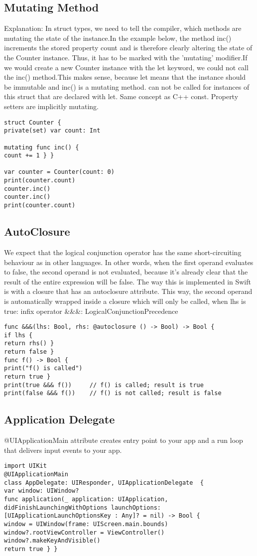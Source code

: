 \subsection{Mutating Method}
Explanation: In struct types, we need to tell the compiler, which methods are mutating the state of the instance.In the example below, the method inc() increments the stored property count and is therefore clearly altering the state of the Counter instance. Thus, it has to be marked with the 'mutating' modifier.If we would create a new Counter instance with the let keyword, we could not call the inc() method.This makes sense, because let means that the instance should be immutable and inc() is a mutating method.
can not be called for instances of this struct that are declared with let. Same concept as C++ const. Property setters are implicitly mutating.
\begin{lstlisting}
struct Counter {
private(set) var count: Int

mutating func inc() {
count += 1 } }

var counter = Counter(count: 0)
print(counter.count)
counter.inc()
counter.inc()
print(counter.count)
\end{lstlisting}

\subsection{AutoClosure}
We expect that the logical conjunction operator has the same short-circuiting behaviour as in other languages. In other words, when the first operand evaluates to false, the second operand is not evaluated, because it's already clear that the result of the entire expression will be false. The way this is implemented in Swift is with a closure that has an autoclosure attribute. This way, the second operand is automatically wrapped inside a closure which will only be called, when lhs is true:
infix operator \&\&\&: LogicalConjunctionPrecedence
\begin{lstlisting}
func &&&(lhs: Bool, rhs: @autoclosure () -> Bool) -> Bool {
if lhs {
return rhs() }
return false }
func f() -> Bool {
print("f() is called")
return true }
print(true &&& f())     // f() is called; result is true
print(false &&& f())	// f() is not called; result is false
\end{lstlisting}


\subsection{Application Delegate}
@UIApplicationMain attribute creates entry point to your app and a run loop that delivers input events to your app.
\begin{lstlisting}
import UIKit
@UIApplicationMain
class AppDelegate: UIResponder, UIApplicationDelegate  {
var window: UIWindow?
func application(_ application: UIApplication,
didFinishLaunchingWithOptions launchOptions: [UIApplicationLaunchOptionsKey : Any]? = nil) -> Bool {
window = UIWindow(frame: UIScreen.main.bounds)
window?.rootViewController = ViewController()
window?.makeKeyAndVisible()
return true } }
\end{lstlisting}

